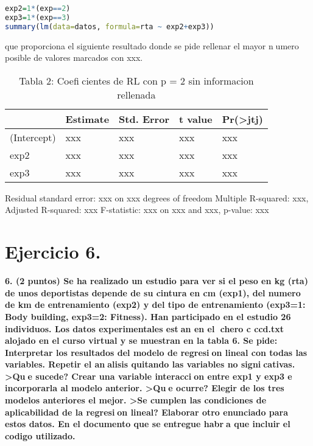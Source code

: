 \documentclass[12pt,spanish]{article}
\begin{document}
\begin{lstlisting}[language=R]
exp2=1*(exp==2)
exp3=1*(exp==3)
summary(lm(data=datos, formula=rta ~ exp2+exp3))
\end{lstlisting}

que proporciona el siguiente resultado donde se pide rellenar el mayor numero posible de valores marcados con xxx.

\begin{table}[]
\begin{tabular}{@{}lllll@{}}
\toprule
            & Estimate & Std. Error & t value & Pr(\textgreater jtj) \\ \midrule
(Intercept) & xxx      & xxx        & xxx     & xxx                  \\
exp2        & xxx      & xxx        & xxx     & xxx                  \\
exp3        & xxx      & xxx        & xxx     & xxx                  \\ \bottomrule
\end{tabular}
\caption{Tabla 2: Coeficientes de RL con p = 2 sin informacion rellenada}
\end{table}


Residual standard error: xxx on xxx degrees of freedom 
Multiple R-squared: xxx, Adjusted R-squared: xxx 
F-statistic: xxx on xxx and xxx, p-value: xxx 






\part*{Ejercicio 6.}	
		\textbf{6. (2 puntos) Se ha realizado un estudio para ver si el peso en kg (rta) de unos deportistas depende de su cintura en cm (exp1), del numero de km de entrenamiento (exp2) y del tipo de entrenamiento (exp3=1: Body building, exp3=2: Fitness). Han participado en el estudio 26 individuos. Los datos experimentales estan en el chero c ccd.txt alojado en el curso virtual y se muestran en la tabla 6.
Se pide:
Interpretar los resultados del modelo de regresion lineal con todas las variables.
Repetir el analisis quitando las variables no signicativas. >Que sucede?
Crear una variable interaccion entre exp1 y exp3 e incorporarla al modelo anterior. >Que ocurre?
Elegir de los tres modelos anteriores el mejor. >Se cumplen las condiciones de aplicabilidad de la
regresion lineal?
Elaborar otro enunciado para estos datos.
En el documento que se entregue habra que incluir el codigo utilizado.}
\end{document}
